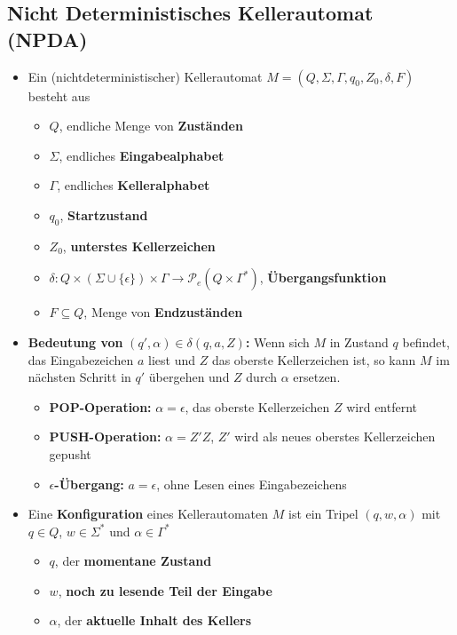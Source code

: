 \documentclass[ieeetran]{article}
\begin{document}
\subsection{Nicht Deterministisches Kellerautomat (NPDA)} %
\label{sub:kellerautomat_pDA_}
\begin{itemize}
	\item Ein (nichtdeterministischer) Kellerautomat $M = (Q, \Sigma, \Gamma, q_0, Z_0, \delta, F)$ besteht aus
\begin{itemize}
  \item $Q$, endliche Menge von \textbf{Zuständen}
\item $\Sigma$, endliches \textbf{Eingabealphabet}
\item $\Gamma$, endliches \textbf{Kelleralphabet}
\item $q_0$, \textbf{Startzustand}
\item $Z_0$, \textbf{unterstes Kellerzeichen}
\item $\delta: Q \times (\Sigma \cup \{\epsilon\}) \times \Gamma \rightarrow \mathcal{P}_e(Q \times \Gamma^*)$, \textbf{Übergangsfunktion}
\item $F \subseteq Q$, Menge von \textbf{Endzuständen}
\end{itemize}

\item \textbf{Bedeutung von }$(q', \alpha) \in \delta(q, a, Z)$\textbf{:} Wenn sich $M$ in Zustand $q$ befindet, das Eingabezeichen $a$ liest und $Z$ das oberste Kellerzeichen ist, so kann $M$ im nächsten Schritt in $q'$ übergehen und $Z$ durch $\alpha$ ersetzen.
	\begin{itemize}
	  \item \textbf{POP-Operation:} $\alpha = \epsilon$, das oberste Kellerzeichen $Z$ wird entfernt
	\item \textbf{PUSH-Operation:} $\alpha = Z'Z$, $Z'$ wird als neues oberstes Kellerzeichen gepusht
	\item \textbf{$\epsilon$-Übergang:} $a = \epsilon$, ohne Lesen eines Eingabezeichens
	\end{itemize}

\item Eine \textbf{Konfiguration} eines Kellerautomaten $M$ ist ein Tripel $(q, w, \alpha)$ mit $q \in Q$, $w \in \Sigma^*$ und $\alpha \in \Gamma^*$
	\begin{itemize}
	  \item $q$, der \textbf{momentane Zustand}
	\item $w$, \textbf{noch zu lesende Teil der Eingabe}
	\item $\alpha$, der \textbf{aktuelle Inhalt des Kellers}
	\end{itemize}


\end{itemize}
\end{document}
